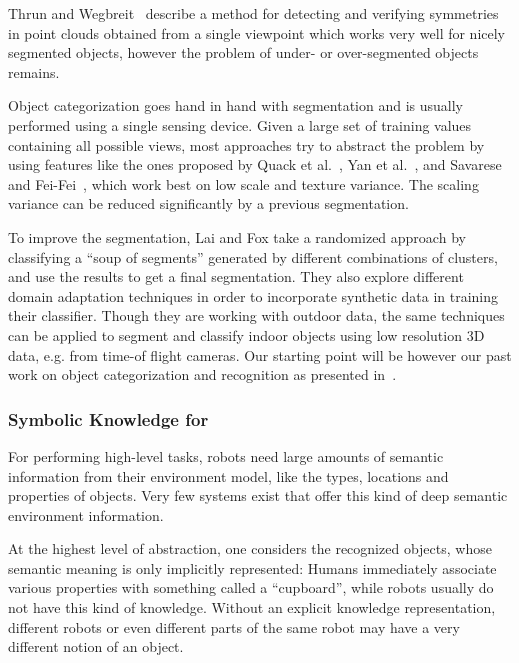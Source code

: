 Thrun and Wegbreit~\cite{Thrun05Symmetries} describe a method for detecting and verifying
symmetries in point clouds obtained from a single viewpoint which works very well for
nicely segmented objects, however the problem of under- or over-segmented objects remains.

Object categorization goes hand in hand with segmentation and is usually
performed using a single sensing device.  Given a large set of training
values containing all possible views, most approaches try to abstract the
problem by using features like the ones proposed by Quack et al.~\cite{quack2007emf},
Yan et al.~\cite{yan2007mbo}, and Savarese and Fei-Fei~\cite{savarese2007goc},
which work best on low scale and texture variance.  The
scaling variance can be reduced significantly by a previous segmentation.

To improve the segmentation, Lai and Fox \cite{Lai-RSS-09} take a randomized approach
by classifying a ``soup of segments'' generated by different combinations of clusters,
and use the results to get a final segmentation. They also explore different domain
adaptation techniques in order to incorporate synthetic data in training their classifier.
Though they are working with outdoor data, the same techniques can be applied to segment
and classify indoor objects using low resolution 3D data, e.g. from time-of flight cameras.
Our starting point will be however our past work on object categorization and recognition
as presented in~\cite{marton11ijrr}.
\subsubsection{Symbolic Knowledge for \ksem}
\label{sec:knowledge-representation}
For performing high-level tasks, robots need large amounts of semantic information from their environment model,
like the types, locations and properties of objects. Very few systems exist that offer this kind
of deep semantic environment information.

At the highest level of abstraction, one considers
the recognized objects, whose semantic meaning is only implicitly represented: Humans immediately
associate various properties with something called a ``cupboard'', while robots usually do not have
this kind of knowledge. Without an explicit knowledge representation, different robots or even different
parts of the same robot may have a very different notion of an object.

